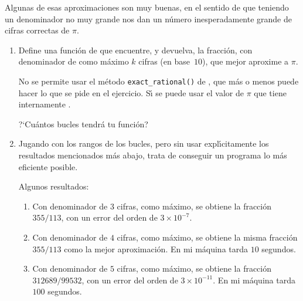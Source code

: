 Algunas de esas aproximaciones son muy buenas, en el sentido de que teniendo un
denominador no muy grande nos dan un n\'umero inesperadamente grande de cifras
correctas de $\pi$.

 \begin{ejer}
 
 \begin{enumerate}
 \item Define una funci\'on de {\sage}  que encuentre, y devuelva,  la
fracci\'on,
con denominador de como m\'aximo  $k$ cifras (en base~$10$), que mejor aproxime
a $\pi.$ 
 
 \footnotesize
 {\sc No se permite} usar el m\'etodo \lstinline|exact_rational()| de {\sage} ,
que
m\'as o menos puede hacer lo que se pide en el ejercicio. {\sc S\'{\i} se
puede} 
usar el valor de $\pi$ que tiene internamente {\sage}.
 
 ?`Cu\'antos bucles tendr\'a tu funci\'on?
 \normalsize
 
 \item Jugando con los rangos de los bucles, pero sin usar expl\'{\i}citamente
los resultados mencionados m\'as abajo,  trata de conseguir un programa lo m\'as
eficiente posible. 
 
 \footnotesize
 \bigskip
 {\sc Algunos resultados:}
 
 \begin{enumerate}
  \item Con denominador de $3$ cifras, como m\'aximo, se obtiene la fracci\'on
$355/113$, con un error del orden de $3\times 10^{-7}$. 

\item Con denominador de $4$ cifras, como m\'aximo, se obtiene la misma
fracci\'on $355/113$ como la mejor aproximaci\'on.  En mi m\'aquina tarda   $10$
segundos. 

\item Con denominador de $5$ cifras, como m\'aximo, se obtiene la fracci\'on
$312689/99532$, con un error del orden de $3\times 10^{-11}$. En mi m\'aquina 
tarda   $100$ segundos. 
 \end{enumerate}

\end{enumerate}
\end{ejer}



